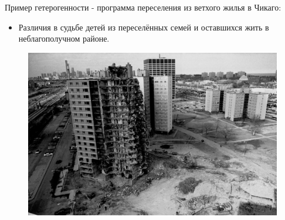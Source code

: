 \begin{frame}{Пример гетерогенности - программа переселения из ветхого жилья в Чикаго: \textcite{chyn2018moved}}
\begin{itemize}
        \item Различия в судьбе детей из переселённых семей и оставшихся жить в неблагополучном районе. 
\end{itemize}
\begin{figure}
    \centering
    \includegraphics[width=\textwidth]{Images/Chicago_houses.jpg}
\end{figure}
\end{frame}

